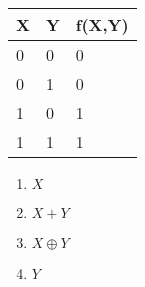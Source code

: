 \documentclass[journal,12pt,twocolumn]{IEEEtran}
\begin{document}
\begin{enumerate}
{    \centering
\begin{tabular}{ |l|l|l| }

\hline
X & Y & f(X,Y) \\ \hline
0 & 0 & 0  \\ \hline
0 & 1 & 0 \\ \hline
1 & 0 & 1  \\ \hline
1 & 1 & 1 \\ \hline
\end{tabular}
}
%
                 
         \begin{enumerate}
         \item $X$
         \item $X+Y$
         \item $X \oplus Y$
         \item $Y$
         \end{enumerate}                   
 

 \end{enumerate}
  
\end{document}
